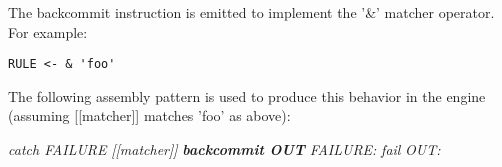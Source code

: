 The backcommit instruction is emitted to implement the
'\&' matcher operator. For example:

\begin{myquote}
\begin{verbatim}
RULE <- & 'foo'
\end{verbatim}
\end{myquote}

The following assembly pattern is used to produce this behavior
in the engine (assuming [[matcher]] matches 'foo' as above):

\begin{myquote}
\textit{catch FAILURE} \newline
\textit{[[matcher]]} \newline
\textit{\textbf{backcommit OUT}} \newline
\textit{FAILURE:} \newline
\textit{fail} \newline
\textit{OUT:} \newline
\end{myquote}
